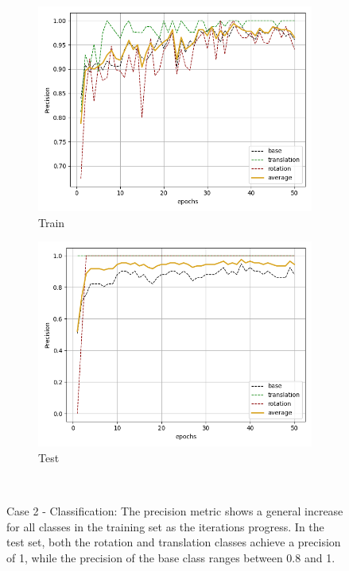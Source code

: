 \begin{figure}[H]
    \begin{subfigure}{.48\linewidth}
    \centering
    \includegraphics[scale=0.45]{Img/cls_noise_train_prec.png}
    \caption{Train}
    \end{subfigure}
    \begin{subfigure}{.48\linewidth}
    \centering
    \includegraphics[scale=0.45]{Img/cls_noise_test_prec.png}
    \caption{Test}
    \end{subfigure}\\
    \caption{Case 2 - Classification: The precision metric shows a general increase for all classes in the training set as the iterations progress. In the test set, both the rotation and translation classes achieve a precision of 1, while the precision of the base class ranges between 0.8 and 1. }
    \label{fig:cls_noise_prec}
\end{figure}
